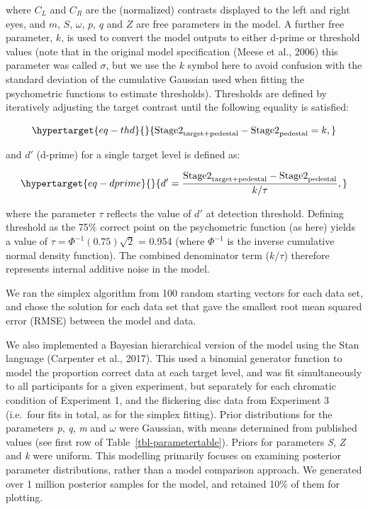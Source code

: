 \documentclass[
  letterpaper,
  DIV=11,
  numbers=noendperiod]{scrartcl}
\begin{document}
where \(C_L\) and \(C_R\) are the (normalized) contrasts displayed to
the left and right eyes, and \(m\), \(S\), \(\omega\), \(p\), \(q\) and
\(Z\) are free parameters in the model. A further free parameter, \(k\),
is used to convert the model outputs to either d-prime or threshold
values (note that in the original model specification (Meese et al.,
2006) this parameter was called \(\sigma\), but we use the \(k\) symbol
here to avoid confusion with the standard deviation of the cumulative
Gaussian used when fitting the psychometric functions to estimate
thresholds). Thresholds are defined by iteratively adjusting the target
contrast until the following equality is satisfied:

\begin{equation}\protect\hypertarget{eq-thd}{}{\mathrm{Stage2}_{\mathrm{target+pedestal}} - \mathrm{Stage2}_{\mathrm{pedestal}} = k,}\label{eq-thd}\end{equation}

and \(d'\) (d-prime) for a single target level is defined as:

\begin{equation}\protect\hypertarget{eq-dprime}{}{d' = \frac{\mathrm{Stage2}_{\mathrm{target+pedestal}} - \mathrm{Stage2}_{\mathrm{pedestal}}}{k/\tau},}\label{eq-dprime}\end{equation}

where the parameter \(\tau\) reflects the value of \(d'\) at detection
threshold. Defining threshold as the 75\% correct point on the
psychometric function (as here) yields a value of
\(\tau = \Phi^{-1}(0.75)\sqrt{2}\) = 0.954 (where \(\Phi^{-1}\) is the
inverse cumulative normal density function). The combined denominator
term (\(k/\tau\)) therefore represents internal additive noise in the
model.

We ran the simplex algorithm from 100 random starting vectors for each
data set, and chose the solution for each data set that gave the
smallest root mean squared error (RMSE) between the model and data.

We also implemented a Bayesian hierarchical version of the model using
the Stan language (Carpenter et al., 2017). This used a binomial
generator function to model the proportion correct data at each target
level, and was fit simultaneously to all participants for a given
experiment, but separately for each chromatic condition of Experiment 1,
and the flickering disc data from Experiment 3 (i.e.~four fits in total,
as for the simplex fitting). Prior distributions for the parameters
\emph{p}, \emph{q}, \emph{m} and \(\omega\) were Gaussian, with means
determined from published values (see first row of
Table~\ref{tbl-parametertable}). Priors for parameters \emph{S},
\emph{Z} and \emph{k} were uniform. This modelling primarily focuses on
examining posterior parameter distributions, rather than a model
comparison approach. We generated over 1 million posterior samples for
the model, and retained 10\% of them for plotting.
\end{document}
